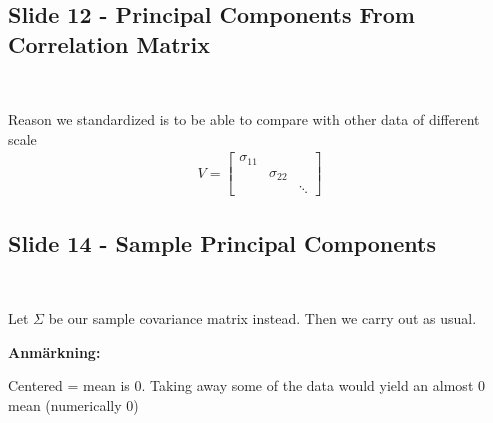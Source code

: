 \subsection{Slide 12 - Principal Components From Correlation Matrix}\hfill\\\par
\noindent Reason we standardized is to be able to compare with other data of different scale
\begin{equation*}
  \begin{gathered}
    V = \begin{bmatrix}\sigma_{11}&&\\&\sigma_{22}&\\&&\ddots\end{bmatrix}
  \end{gathered}
\end{equation*}
\par\bigskip
\subsection{Slide 14 - Sample Principal Components}\hfill\\\par
\noindent Let $\Sigma$ be our sample covariance matrix instead. Then we carry out as usual.
\par\bigskip
\noindent\textbf{Anmärkning:}\par
\noindent Centered = mean is 0. Taking away some of the data would yield an almost 0 mean (numerically 0)
